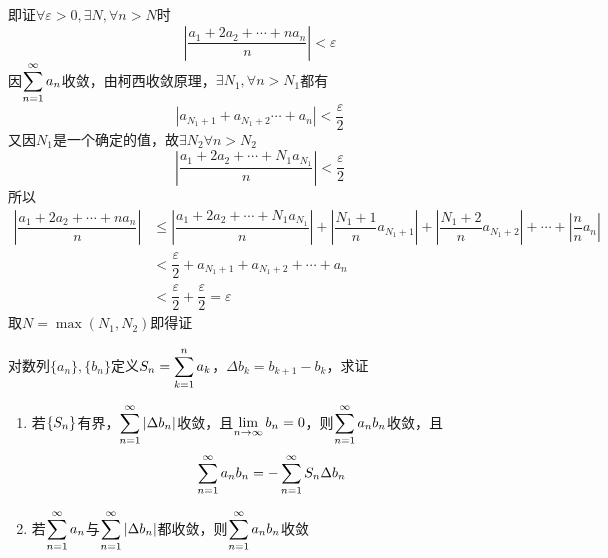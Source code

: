 \begin{analysis}
即证$\forall\varepsilon>0,\exists N,\forall n>N$时
\[\left|\dfrac{a_1+2a_2+\cdots+na_n}{n}\right|<\varepsilon\]
因$\displaystyle\sum_{n=1}^{\infty}a_n$收敛，由柯西收敛原理，$\exists N_1,\forall n>N_1$都有
\[|a_{N_1+1}+a_{N_1+2}\cdots+a_n|<\dfrac{\varepsilon}{2}\]
又因$N_1$是一个确定的值，故$\exists N_2\forall n>N_2$
\[\left|\dfrac{a_1+2a_2+\cdots+N_1a_{N_1}}{n}\right|<\dfrac{\varepsilon}{2}\]
所以
\[\begin{aligned}
\left|\dfrac{a_1+2a_2+\cdots+na_n}{n}\right|
&\leq\left|\dfrac{a_1+2a_2+\cdots+N_1a_{N_1}}{n}\right|+\left|\dfrac{N_1+1}{n}a_{N_1+1}\right|+\left|\dfrac{N_1+2}{n}a_{N_1+2}\right|+\cdots+\left|\dfrac{n}{n}a_{n}\right|\\
&<\dfrac{\varepsilon}{2}+a_{N_1+1}+a_{N_1+2}+\cdots+a_n\\
&<\dfrac{\varepsilon}{2}+\dfrac{\varepsilon}{2}=\varepsilon
\end{aligned}\]
取$N=\max(N_1,N_2)$即得证
\end{analysis}
\begin{example}%
对数列$\{a_n\},\{b_n\}$定义$S_n=\displaystyle\sum_{k=1}^{n}a_k$，$\Delta b_k=b_{k+1}-b_k$，求证
\begin{enumerate}
	\item 若$\{S_n\}$有界，$\displaystyle\sum_{n=1}^{\infty}|\Delta b_n|$收敛，且$\displaystyle\lim_{n\to\infty}b_n=0$，则$\displaystyle\sum_{n=1}^{\infty}a_nb_n$收敛，且
	\[\displaystyle\sum_{n=1}^{\infty}a_nb_n=-\displaystyle\sum_{n=1}^{\infty}S_n\Delta b_n\]
	\item 若$\displaystyle\sum_{n=1}^{\infty}a_n$与$\displaystyle\sum_{n=1}^{\infty}|\Delta b_n|$都收敛，则$\displaystyle\sum_{n=1}^{\infty}a_nb_n$收敛
\end{enumerate}
\end{example}
